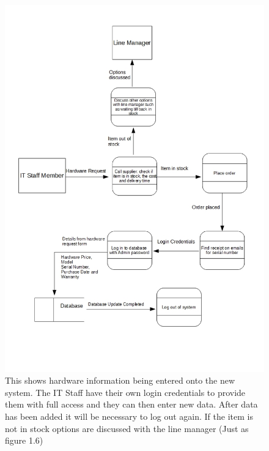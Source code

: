 \begin{figure}[H]
\includegraphics[width=\textwidth]{DFDLogin.jpg}
\caption{This shows hardware information being entered onto the new system. The IT Staff have their own login credentials to provide them with full access and they can then enter new data. After data has been added it will be necessary to log out again. If the item is not in stock options are discussed with the line manager (Just as figure 1.6)  } \label{Page1Interview}
\end{figure}

